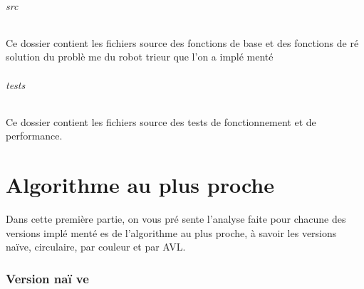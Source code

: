 \documentclass[12pt,a4paper]{article}
\begin{document}
\paragraph*{src}
Ce dossier contient les fichiers source des fonctions de base et des fonctions de r\'e solution du probl\`e me du robot trieur que l'on a impl\'e ment\'e
\paragraph*{tests}
Ce dossier contient les fichiers source des tests de fonctionnement et de performance.

\part{Algorithme au plus proche}
Dans cette premi\`ere partie, on vous pr\'e sente l'analyse faite pour chacune des versions impl\'e ment\'e es de l'algorithme au plus proche, \`a savoir les versions na\"ive, circulaire, par couleur et par AVL.
\section{Version na\"i ve}
\end{document}
